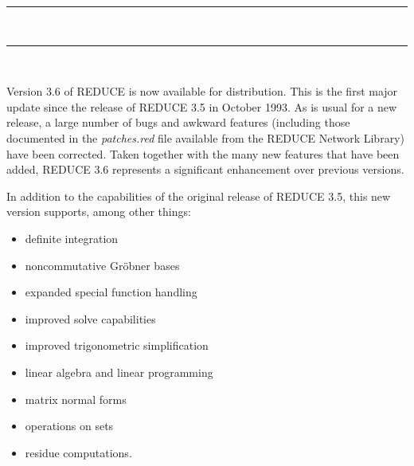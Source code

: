 
% 

\setlength{\parindent}{0pt}
\setlength{\parskip}{6pt}
\raggedbottom
\setlength{\textwidth}{6.2in}
\setlength{\oddsidemargin}{0.2in}
\setlength{\evensidemargin}{0in}
\setlength{\textheight}{8.7in}
\setlength{\topmargin}{-0.5in}
\newlength{\redboxwidth}
\setlength{\redboxwidth}{4in}
\newcommand{\REDUCE}{REDUCE}
\pagestyle{empty}

\begin{center}
%
 \rule[-0.31cm]{3pt}{1.0cm}\\[-0.6mm]
 \hspace*{1pt}\rule{82mm}{3pt}\\[0.2in]
\end{center}

Version 3.6 of REDUCE is now available for distribution.  This is the
first major update since the release of {\REDUCE} 3.5 in October 1993.  As
is usual for a new release, a large number of bugs and awkward features
(including those documented in the {\em patches.red} file available from the
REDUCE Network Library) have been corrected.  Taken together with the many
new features that have been added, {\REDUCE} 3.6 represents a significant
enhancement over previous versions.

In addition to the capabilities of the original release of {\REDUCE} 3.5,
this new version supports, among other things:

\vspace*{-0.1in}
\begin{itemize}
\item {definite integration}
\item {noncommutative Gr\"obner bases}
\item {expanded special function handling}
\item {improved solve capabilities}
\item {improved trigonometric simplification}
\item {linear algebra and linear programming}
\item {matrix normal forms}
\item {operations on sets}
\item {residue computations.}
\end{itemize}

